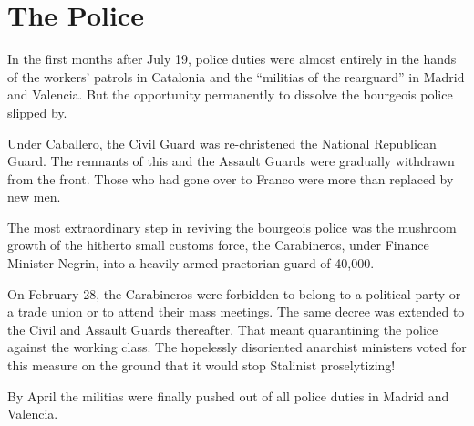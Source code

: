 \section{The Police}

In the first months after July 19, police duties were almost entirely in the hands of the workers’ patrols in Catalonia and the ``militias of the rearguard'' in Madrid and Valencia. But the opportunity permanently to dissolve the bourgeois police slipped by.
\nowidow

Under Caballero, the Civil Guard was re-christened the National Republican Guard. The remnants of this and the Assault Guards were gradually withdrawn from the front. Those who had gone over to Franco were more than replaced by new men.

The most extraordinary step in reviving the bourgeois police was the mushroom growth of the hitherto small customs force, the Carabineros, under Finance Minister Negrin, into a heavily armed praetorian guard of 40,000.

On February 28, the Carabineros were forbidden to belong to a political party or a trade union or to attend their mass meetings. The same decree was extended to the Civil and Assault Guards thereafter. That meant quarantining the police against the working class. The hopelessly disoriented anarchist ministers voted for this measure on the ground that it would stop Stalinist proselytizing!

By April the militias were finally pushed out of all police duties in Madrid and Valencia.

